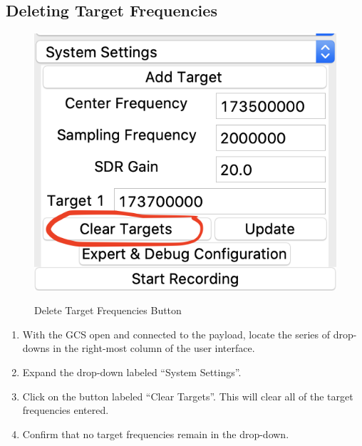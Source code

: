 \documentclass{report}
\begin{document}
		\subsection{Deleting Target Frequencies}
			\begin{figure}[htb]
				\centering
				\caption{Delete Target Frequencies Button}
				\includegraphics[scale=0.5]{delete_targets_btn.jpg}
				\label{fig:delete_targets_btn}
			\end{figure}
			\begin{enumerate}
				\item With the GCS open and connected to the payload, locate the series of drop-downs in the right-most column of the user interface.
				\item Expand the drop-down labeled ``System Settings''.
				\item Click on the button labeled ``Clear Targets''. This will clear all of the target frequencies entered.
				\item Confirm that no target frequencies remain in the drop-down. 
			\end{enumerate}
\end{document}
